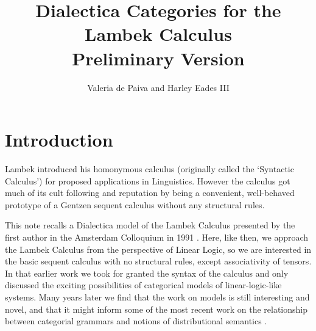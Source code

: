 \documentclass{llncs}
\begin{document}
\title{Dialectica Categories for the Lambek Calculus\\
    Preliminary Version
}
\author{Valeria de Paiva and Harley Eades III}
\date{}


\maketitle


\section*{Introduction}
 Lambek  introduced his homonymous calculus (originally called the  `Syntactic Calculus') for  proposed applications in Linguistics.  
 However the calculus got much of its cult following  and reputation by being a convenient, well-behaved prototype of a Gentzen sequent calculus without any structural rules. 

This note recalls a Dialectica model of the Lambek Calculus presented
by the first author in the Amsterdam Colloquium in 1991
\cite{depaiva1991}. Here, like then, we approach the Lambek Calculus
from the perspective of Linear Logic, so we are interested in the
basic sequent calculus with no structural rules, except associativity
of tensors. In that earlier work we took for granted the syntax of the
calculus and only discussed the exciting possibilities of categorical
models of linear-logic-like systems.  Many years later we find that
the work on models is still interesting and novel, and that it might
inform some of the most recent work on the relationship between
categorial grammars and notions of distributional semantics
\cite{coecke2013}.

\end{document}
